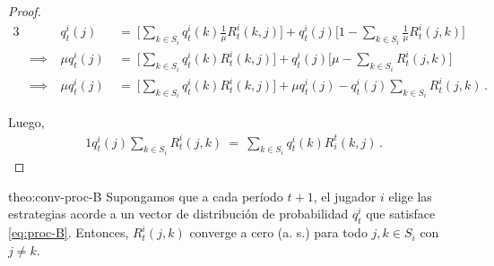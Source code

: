 \begin{proof}
\begin{alignat}{3}
  & & q^i_t(j)\ &=\ \biggl[\sum_{k \in S_i} q^i_t(k)\frac{1}{\mu}R^i_t(k,j)\biggr] + q^i_t(j)\biggl[1 - \sum_{k \in S_i} \frac{1}{\mu} R^i_t(j,k)\biggr] \\
  &\implies\
  &\mu q_t^i(j)\ &=\ \biggl[\sum_{k \in S_i}q^i_t(k)R^i_t(k,j)\biggr] + q^i_t(j)\biggl[\mu - \sum_{k \in S_i} R^i_t(j, k)\biggr] \\
  &\implies\
  &\mu q^i_t(j)\ & =\ \biggl[\sum_{k \in S_i}q^i_t(k)R^i_t(k,j)\biggr] + \mu q^i_t(j) - q^i_t(j)\sum_{k\in S_i} R^i_t(j,k) \,.
\end{alignat}

Luego,
\begin{alignat}{1}
q^i_t(j)\sum_{k \in S_i} R^i_t(j,k)\ =\ \sum_{k \in S_i} q_t^i(k)R_i^t(k,j) \,.
\end{alignat}
\end{proof}

\begin{reptheorem}{theo:conv-proc-B}
Supongamos que a cada período $t+1$, el jugador $i$ elige las estrategias acorde a un vector de distribución de probabilidad $q_t^i$ que satisface \eqref{eq:proc-B}. Entonces, $R^i_t(j, k)$ converge a cero (a. s.) para todo $j, k \in S_i$ con $j \neq k$.
\end{reptheorem}

